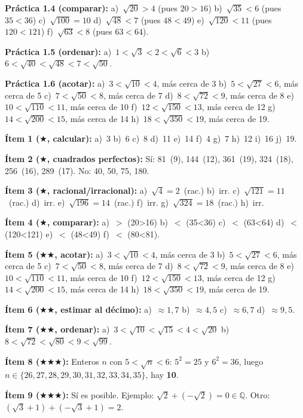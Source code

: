 \documentclass[11pt, letterpaper]{article}
\begin{document}
\textbf{Práctica 1.4 (comparar):} a)~$\sqrt{20}>4$ (pues $20>16$) \; b)~$\sqrt{35}<6$ (pues $35<36$) \; c)~$\sqrt{100}=10$ \; d)~$\sqrt{48}<7$ (pues $48<49$) \; e)~$\sqrt{120}<11$ (pues $120<121$) \; f)~$\sqrt{63}<8$ (pues $63<64$).

\textbf{Práctica 1.5 (ordenar):} a)~$1<\sqrt{3}<2<\sqrt{6}<3$ \; b)~$6<\sqrt{40}<\sqrt{48}<7<\sqrt{50}$.

\textbf{Práctica 1.6 (acotar):} a)~$3<\sqrt{10}<4$, más cerca de 3 \; b)~$5<\sqrt{27}<6$, más cerca de 5 \; c)~$7<\sqrt{50}<8$, más cerca de 7 \; d)~$8<\sqrt{72}<9$, más cerca de 8 \; e)~$10<\sqrt{110}<11$, más cerca de 10 \; f)~$12<\sqrt{150}<13$, más cerca de 12 \; g)~$14<\sqrt{200}<15$, más cerca de 14 \; h)~$18<\sqrt{350}<19$, más cerca de 19.

\medskip
\textbf{Ítem 1 ($\bigstar$, calcular):} a)~3 \; b)~6 \; c)~8 \; d)~11 \; e)~14 \; f)~4 \; g)~7 \; h)~12 \; i)~16 \; j)~19.

\textbf{Ítem 2 ($\bigstar$, cuadrados perfectos):} Sí: 81~(9), 144~(12), 361~(19), 324~(18), 256~(16), 289~(17). No: 40, 50, 75, 180.

\textbf{Ítem 3 ($\bigstar$, racional/irracional):} a)~$\sqrt{4}=2$~(rac.) \; b)~irr. \; c)~$\sqrt{121}=11$~(rac.) \; d)~irr. \; e)~$\sqrt{196}=14$~(rac.) \; f)~irr. \; g)~$\sqrt{324}=18$~(rac.) \; h)~irr.

\textbf{Ítem 4 ($\bigstar$, comparar):} a)~$>$ (20>16) \; b)~$<$ (35<36) \; c)~$<$ (63<64) \; d)~$<$ (120<121) \; e)~$<$ (48<49) \; f)~$<$ (80<81).

\textbf{Ítem 5 ($\bigstar\bigstar$, acotar):} a)~$3<\sqrt{10}<4$, más cerca de 3 \; b)~$5<\sqrt{27}<6$, más cerca de 5 \; c)~$7<\sqrt{50}<8$, más cerca de 7 \; d)~$8<\sqrt{72}<9$, más cerca de 8 \; e)~$10<\sqrt{110}<11$, más cerca de 10 \; f)~$12<\sqrt{150}<13$, más cerca de 12 \; g)~$14<\sqrt{200}<15$, más cerca de 14 \; h)~$18<\sqrt{350}<19$, más cerca de 19.

\textbf{Ítem 6 ($\bigstar\bigstar$, estimar al décimo):} a)~$\approx 1{,}7$ \; b)~$\approx 4{,}5$ \; c)~$\approx 6{,}7$ \; d)~$\approx 9{,}5$.

\textbf{Ítem 7 ($\bigstar\bigstar$, ordenar):} a)~$3<\sqrt{10}<\sqrt{15}<4<\sqrt{20}$ \; b)~$8<\sqrt{72}<\sqrt{80}<9<\sqrt{99}$.

\textbf{Ítem 8 ($\bigstar\bigstar\bigstar$):} Enteros $n$ con $5<\sqrt{n}<6$: $5^2=25$ y $6^2=36$, luego $n\in\{26,27,28,29,30,31,32,33,34,35\}$, hay \textbf{10}.

\textbf{Ítem 9 ($\bigstar\bigstar\bigstar$):} Sí es posible. Ejemplo: $\sqrt{2}+(-\sqrt{2})=0\in\mathbb{Q}$. Otro: $(\sqrt{3}+1)+(-\sqrt{3}+1)=2$.
\end{document}
